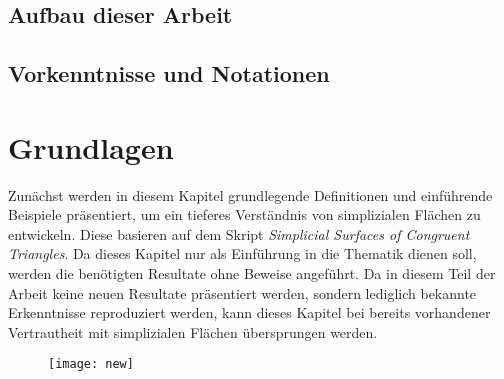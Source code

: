 \documentclass[12pt,titlepage,twoside,cleardoublepage]{article}
\theoremstyle{nummermitklammern}
\numberwithin{equation}{section}
\begin{document}
\subsection{Aufbau dieser Arbeit}
\subsection{Vorkenntnisse und Notationen}
\section{Grundlagen} \label{Grundlagen}
Zunächst werden in diesem Kapitel grundlegende Definitionen und einführende Beispiele präsentiert, um ein tieferes Verständnis von simplizialen Flächen zu entwickeln. Diese basieren auf dem Skript \emph{Simplicial Surfaces of Congruent Triangles}. Da dieses Kapitel nur als Einführung in die Thematik dienen soll, werden die benötigten Resultate ohne Beweise angeführt. Da in diesem Teil der Arbeit keine neuen Resultate präsentiert werden, sondern lediglich bekannte Erkenntnisse reproduziert werden, kann dieses Kapitel bei bereits vorhandener Vertrautheit mit simplizialen Flächen übersprungen werden.
\begin{figure}[H]
\begin{center}
\texttt{[image: new]}
\end{center}
\end{figure}
\end{document}

